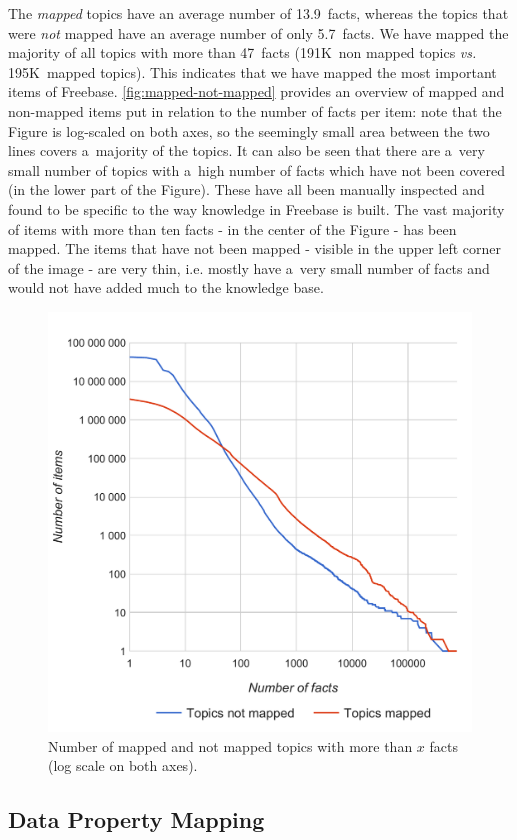 \documentclass{sig-alternate-2013}
\begin{document}
The \emph{mapped} topics have an average number of 13.9~facts,
whereas the topics that were \emph{not} mapped have an average number of only 5.7~facts.
We have mapped the majority of all topics with more than 47~facts
(191K~non mapped topics \textit{vs.} 195K~mapped topics).
This indicates that we have mapped the most important items of Freebase.
\autoref{fig:mapped-not-mapped} provides an overview of mapped and non-mapped items
put in relation to the number of facts per item: note that the Figure is log-scaled
on both axes, so the seemingly small area between the two lines covers a~majority of
the topics. It can also be seen that there are a~very small number of topics with
a~high number of facts which have not been covered (in the lower part of the Figure).
These have all been manually inspected and found to be specific to the way knowledge
in Freebase is built. The vast majority of items with more than ten facts - in the
center of the Figure - has been mapped. The items that have not been mapped -
visible in the upper left corner of the image - are very thin,
i.e. mostly have a~very small number of facts and
would not have added much to the knowledge base.

\begin{figure}[!htbp]
  \centering
  \includegraphics[width=8.45 cm]{img/facts-topics-mapping.pdf}
  \caption{Number of mapped and not mapped topics with more than $x$ facts (log scale on both axes).}
  \label{fig:mapped-not-mapped}
\end{figure}

\subsection{Data Property Mapping}
\end{document}
